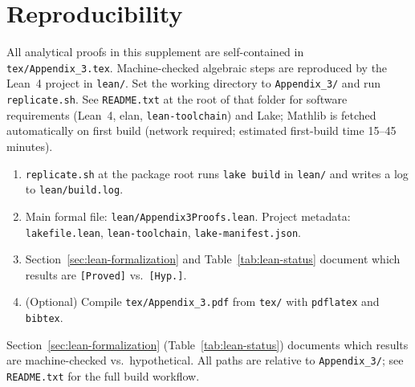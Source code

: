 \documentclass[ecta,nameyear,final,supplement]{econsocart}
\numberwithin{equation}{section}
\numberwithin{table}{section}
\theoremstyle{definition}
\begin{document}
\section{Reproducibility}
\label{sec:repro}

\begin{sloppypar}
All analytical proofs in this supplement are self-contained in
\texttt{tex/Appendix\_3.tex}. Machine-checked algebraic steps are reproduced by
the Lean~4 project in \texttt{lean/}. Set the working directory to
\texttt{Appendix\_3/} and run \texttt{replicate.sh}. See \texttt{README.txt} at the
root of that folder for software requirements (Lean~4, elan,
\texttt{lean-toolchain}) and Lake; Mathlib is fetched automatically on first
build (network required; estimated first-build time 15--45 minutes).
\end{sloppypar}

\begin{enumerate}
\item \texttt{replicate.sh} at the package root runs \texttt{lake build} in
  \texttt{lean/} and writes a log to \texttt{lean/build.log}.
\item Main formal file: \texttt{lean/Appendix3Proofs.lean}. Project metadata:
  \texttt{lakefile.lean}, \texttt{lean-toolchain}, \texttt{lake-manifest.json}.
\item Section~\ref{sec:lean-formalization} and Table~\ref{tab:lean-status}
  document which results are \texttt{[Proved]} vs.\ \texttt{[Hyp.]}.
\item (Optional) Compile \texttt{tex/Appendix\_3.pdf} from \texttt{tex/} with
  \texttt{pdflatex} and \texttt{bibtex}.
\end{enumerate}

\begin{sloppypar}
Section~\ref{sec:lean-formalization} (Table~\ref{tab:lean-status}) documents
which results are machine-checked vs.\ hypothetical. All paths are relative to
\texttt{Appendix\_3/}; see \texttt{README.txt} for the full build workflow.
\end{sloppypar}



\end{document}
